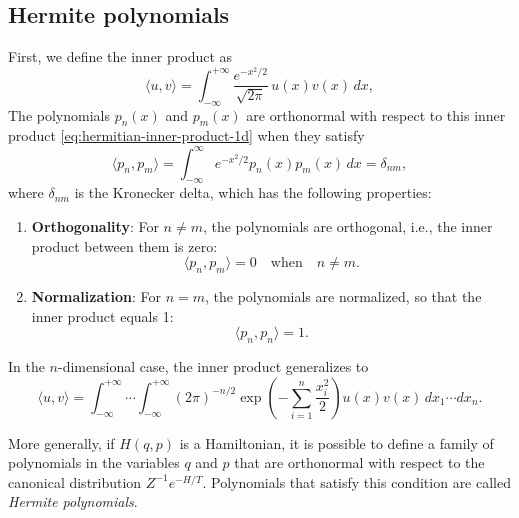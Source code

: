 \documentclass[12pt]{article}
\begin{document}
\subsection{Hermite polynomials}

First, we define the inner product as
\begin{equation}
	\langle u, v \rangle = \int_{-\infty}^{+\infty} \frac{e^{-x^2/2}}{\sqrt{2 \pi}} \, u(x) v(x) \, dx,
	\label{eq:hermitian-inner-product-1d}
\end{equation}
The polynomials $p_n(x)$ and $p_m(x)$ are orthonormal with respect to this inner product \eqref{eq:hermitian-inner-product-1d} when they satisfy
\begin{equation*}
	\langle p_n, p_m \rangle = \int_{-\infty}^{\infty} e^{-x^2/2} p_n(x) p_m(x) \, dx = \delta_{nm},
\end{equation*}
where $\delta_{nm}$ is the Kronecker delta, which has the following properties:

\begin{enumerate}
	\item \textbf{Orthogonality}: For $n \neq m$, the polynomials are orthogonal, i.e., the inner product between them is zero:
	      \begin{equation*}
	      	\langle p_n, p_m \rangle = 0 \quad \text{when} \quad n \neq m.
	      \end{equation*}
	                    
	\item \textbf{Normalization}: For $n = m$, the polynomials are normalized, so that the inner product equals 1:
	      \begin{equation*}
	      	\langle p_n, p_n \rangle = 1.
	      \end{equation*}
\end{enumerate}

In the $n$-dimensional case, the inner product generalizes to
\begin{equation*}
	\langle u, v \rangle = \int_{-\infty}^{+\infty} \cdots \int_{-\infty}^{+\infty} (2 \pi)^{-n/2} 
	\exp \!\left(-\sum_{i=1}^n \frac{x_i^2}{2} \right) u(x) v(x) \, dx_1 \cdots dx_n.
\end{equation*}

More generally, if $H(q, p)$ is a Hamiltonian, it is possible to define a family of polynomials in the variables $q$ and $p$ that are orthonormal with respect to the canonical distribution $Z^{-1} e^{-H/T}$. Polynomials that satisfy this condition are called \textit{Hermite polynomials}.
\end{document}
